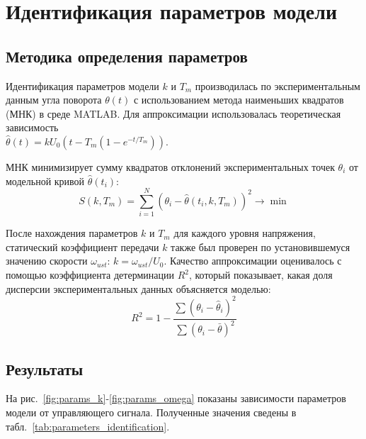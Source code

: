 \documentclass[a4paper, 12pt]{article}
\begin{document}
    \section{Идентификация параметров модели}
    \label{sec:identification}

    \subsection{Методика определения параметров}
    Идентификация параметров модели \(k\) и \(T_m\) производилась по экспериментальным данным угла поворота \(\theta(t)\) с использованием метода наименьших квадратов (МНК) в среде MATLAB. Для аппроксимации использовалась теоретическая зависимость \\\(\hat{\theta}(t) = k U_0 \left( t - T_m (1 - e^{-t/T_m}) \right)\).

    МНК минимизирует сумму квадратов отклонений экспериментальных точек \(\theta_i\) от модельной кривой \(\hat{\theta}(t_i)\):
    \begin{equation}
        S(k, T_m) = \sum_{i=1}^{N} \left( \theta_i - \hat{\theta}(t_i, k, T_m) \right)^2 \rightarrow \min
    \end{equation}

    После нахождения параметров \(k\) и \(T_m\) для каждого уровня напряжения, статический коэффициент передачи \(k\) также был проверен по установившемуся значению скорости \(\omega_{ust}\): \(k = \omega_{ust} / U_0\). Качество аппроксимации оценивалось с помощью коэффициента детерминации \(R^2\), который показывает, какая доля дисперсии экспериментальных данных объясняется моделью:
    \begin{equation}
        R^2 = 1 - \frac{\sum (\theta_i - \hat{\theta}_i)^2}{\sum (\theta_i - \bar{\theta})^2}
    \end{equation}

    \subsection{Результаты}
    На рис.~\ref{fig:params_k}-\ref{fig:params_omega} показаны зависимости параметров модели от управляющего сигнала. Полученные значения сведены в табл.~\ref{tab:parameters_identification}.
\end{document}
